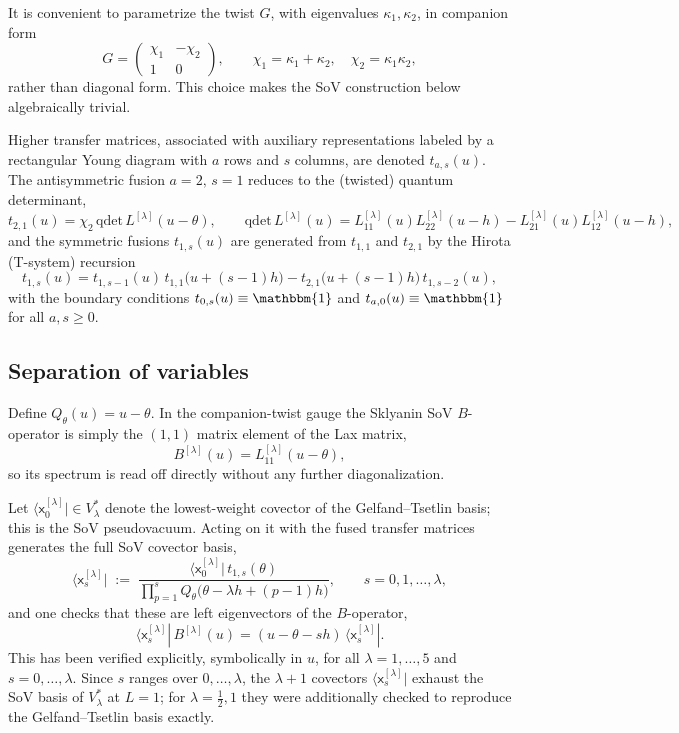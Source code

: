 \documentclass[12pt]{article}
\newcommand{\Ident}{\mathbbm{1}}
\newcommand{\svx}{\mathsf{x}}
\begin{document}
It is convenient to parametrize the twist $G$, with eigenvalues $\kappa_1,\kappa_2$, in companion form
\[
G = \begin{pmatrix} \chi_1 & -\chi_2 \\ 1 & 0 \end{pmatrix}, \qquad
\chi_1=\kappa_1+\kappa_2,\quad \chi_2=\kappa_1\kappa_2 ,
\]
rather than diagonal form. This choice makes the SoV construction below algebraically trivial.

Higher transfer matrices, associated with auxiliary representations labeled by a rectangular Young diagram with $a$ rows and $s$ columns, are denoted $t_{a,s}(u)$. The antisymmetric fusion $a=2,\,s=1$ reduces to the (twisted) quantum determinant,
\[
t_{2,1}(u) = \chi_2\, \mathrm{qdet}\, L^{[\lambda]}(u-\theta), \qquad
\mathrm{qdet}\,L^{[\lambda]}(u) = L^{[\lambda]}_{11}(u)L^{[\lambda]}_{22}(u-h) - L^{[\lambda]}_{21}(u)L^{[\lambda]}_{12}(u-h),
\]
and the symmetric fusions $t_{1,s}(u)$ are generated from $t_{1,1}$ and $t_{2,1}$ by the Hirota (T-system) recursion
\[
t_{1,s}(u) = t_{1,s-1}(u)\,t_{1,1}\big(u+(s-1)h\big) - t_{2,1}\big(u+(s-1)h\big)\,t_{1,s-2}(u),
\]
with the boundary conditions $t_{0,s}(u)\equiv\Ident$ and $t_{a,0}(u)\equiv\Ident$ for all $a,s\geq0$.

\subsection{Separation of variables}

Define $Q_\theta(u) = u-\theta$. In the companion-twist gauge the Sklyanin SoV $B$-operator is simply the $(1,1)$ matrix element of the Lax matrix,
\[
B^{[\lambda]}(u) = L^{[\lambda]}_{11}(u-\theta) ,
\]
so its spectrum is read off directly without any further diagonalization.

Let $\langle \svx^{[\lambda]}_0|\in V_\lambda^*$ denote the lowest-weight covector of the Gelfand--Tsetlin basis; this is the SoV pseudovacuum. Acting on it with the fused transfer matrices generates the full SoV covector basis,
\[
\langle \svx^{[\lambda]}_s| \;:=\; \frac{\langle \svx^{[\lambda]}_0|\, t_{1,s}(\theta)}{\displaystyle\prod_{p=1}^{s} Q_\theta\big(\theta-\lambda h+(p-1)h\big)}, \qquad s=0,1,\dots,\lambda ,
\]
and one checks that these are left eigenvectors of the $B$-operator,
\[
\langle \svx^{[\lambda]}_s|\, B^{[\lambda]}(u) = (u-\theta-sh)\, \langle \svx^{[\lambda]}_s| .
\]
This has been verified explicitly, symbolically in $u$, for all $\lambda=1,\dots,5$ and $s=0,\dots,\lambda$. Since $s$ ranges over $0,\dots,\lambda$, the $\lambda+1$ covectors $\langle \svx^{[\lambda]}_s|$ exhaust the SoV basis of $V_\lambda^*$ at $L=1$; for $\lambda=\tfrac12,1$ they were additionally checked to reproduce the Gelfand--Tsetlin basis exactly.



\end{document}
